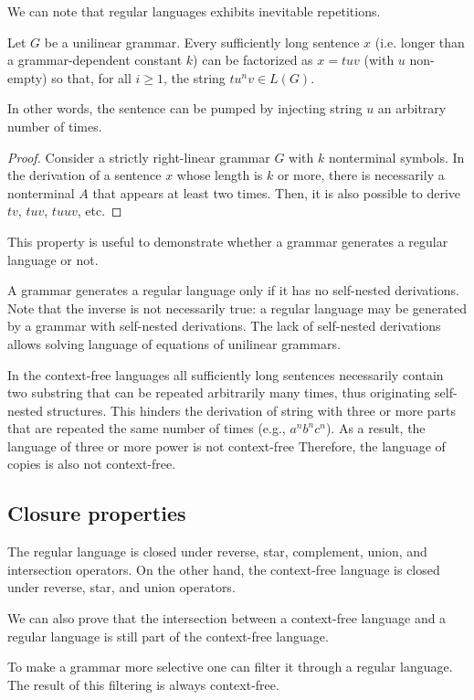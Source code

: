We can note that regular languages exhibits inevitable repetitions. 
\begin{property}
    Let $G$ be a unilinear grammar. 
    Every sufficiently long sentence $x$ (i.e. longer than a grammar-dependent constant $k$) can be factorized as $x=tuv$ (with $u$ non-empty) so that, for all $i \geq 1$, the string $tu^nv \in L(G)$. 
\end{property}
In other words, the sentence can be pumped by injecting string $u$ an arbitrary number of times. 
\begin{proof}
    Consider a strictly right-linear grammar $G$ with $k$ nonterminal symbols. 
    In the derivation of a sentence $x$ whose length is $k$ or more, there is necessarily a nonterminal $A$ that appears at least two times. 
    Then, it is also possible to derive $tv$, $tuv$, $tuuv$, etc.
\end{proof}
This property is useful to demonstrate whether a grammar generates a regular language or not. 

A grammar generates a regular language only if it has no self-nested derivations. 
Note that the inverse is not necessarily true: a regular language may be generated by a grammar with self-nested derivations. 
The lack of self-nested derivations allows solving language of equations of unilinear grammars. 

In the context-free languages all sufficiently long sentences necessarily contain two substring that can be repeated arbitrarily many times, thus originating self-nested structures. 
This hinders the derivation of string with three or more parts that are repeated the same number of times (e.g., $a^nb^nc^n$). 
As a result, the language of three or more power is not context-free
Therefore, the language of copies is also not context-free. 

\subsection*{Closure properties}
The regular language is closed under reverse, star, complement, union, and intersection operators. 
On the other hand, the context-free language is closed under reverse, star, and union operators. 

We can also prove that the intersection between a context-free language and a regular language is still part of the context-free language. 

To make a grammar more selective one can filter it through a regular language. 
The result of this filtering is always context-free.